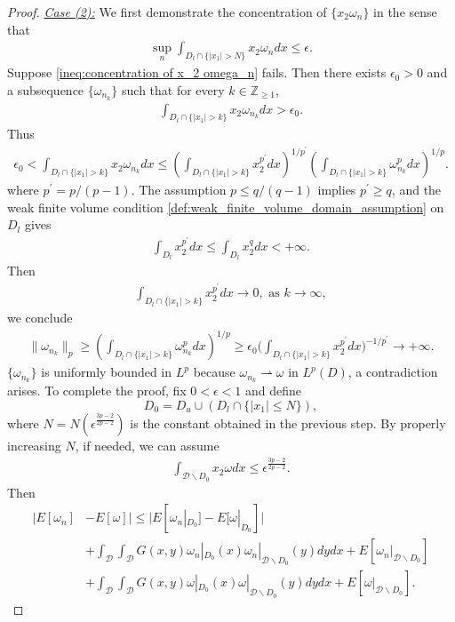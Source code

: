 \documentclass[11pt,letterpaper]{amsart}
\theoremstyle{definition}
\theoremstyle{remark}
\newcommand{\D}{\mathcal{D}}
\renewcommand{\tt}[1]{\text{#1}}
\numberwithin{equation}{section}
\begin{document}
\begin{proof}
    \underline{\textit{Case (2):}} We first demonstrate the concentration of $\{x_2\omega_n\}$ in the sense that
    \begin{align}
        \sup_{n}\int_{D_l \cap \{|x_1|>N\}} x_2 \omega_n dx\leq \epsilon. \label{ineq:concentration of x_2 omega_n}
    \end{align}
    Suppose \eqref{ineq:concentration of x_2 omega_n} fails. Then there exists $\epsilon_0>0$ and a subsequence $\{\omega_{n_k}\}$ such that for every $k \in \mathbb{Z}_{\geq 1}$,
    \begin{align*}
        \int_{D_l \cap \{|x_1|>k\}} x_2 \omega_{n_k} dx > \epsilon_0.
    \end{align*}
    Thus 
    \begin{align*}
        \epsilon_0 < \int_{D_l \cap \{|x_1|>k\}} x_2 \omega_{n_k} dx \leq  \left(\int_{D_l \cap \{|x_1|>k\}} x_2^{p^\prime} dx\right)^{1/p^\prime}\left(\int_{D_l \cap \{|x_1|>k\}} \omega_{n_k}^p dx\right)^{1/p}.
    \end{align*}
    where $p^\prime=p/(p-1) $. The assumption $p \leq q/(q-1)$ implies $p^\prime\geq q$, and the weak finite volume condition \eqref{def:weak_finite_volume_domain_assumption} on $D_l$ gives
    \begin{align*}
        \int_{D_l}x_2^{p^\prime}dx\leq \int_{D_l}x_2^{q}dx <+\infty.
    \end{align*}
    Then 
    \begin{align*}
        \int_{D_l \cap \{|x_1|>k\}} x_2^{p^\prime} dx \rightarrow 0, \tt{ as } k \rightarrow \infty,
    \end{align*}
    we conclude
    \begin{align*}
        \|\omega_{n_k}\|_{p} \geq (\int_{D_l \cap \{|x_1|>k\}} \omega_{n_k}^p dx)^{1/p} \geq \epsilon_0 \Big(\int_{D_l \cap \{|x_1|>k\}} x_2^{p^\prime} dx\Big)^{-1/p^\prime}\rightarrow +\infty.
    \end{align*}
    $\{\omega_{n_k}\}$ is uniformly bounded in $L^p$ because $\omega_{n_k}\rightharpoonup\omega$ in $L^p(D)$, a contradiction arises. 
    To complete the proof, fix $0<\epsilon<1$ and define
    $$
        D_0=D_u\cup(D_l \cap \{|x_1|\leq N\}),
    $$
    where $N=N(\epsilon^{\frac{3p-2}{2p-2}})$ is the constant obtained in the previous step. By properly increasing $N$, if needed, we can assume
    \begin{align*}
        \int_{\D\backslash D_0} x_2\omega dx\leq \epsilon^{\frac{3p-2}{2p-2}}.
    \end{align*}
    Then 
    \begin{align*}
        |E[\omega_n] & - E[\omega]| \leq |E[\omega_n|_{D_0}]-E[\omega|_{D_0}]| \\
        & + \int_{\mathcal{D}}\int_{\mathcal{D}} G(x,y)\omega_n|_{D_0}(x)\omega_n|_{\mathcal{D}\backslash D_0}(y)dydx + E[\omega_n|_{\mathcal{D}\backslash D_0}]\\
        & + \int_{\mathcal{D}}\int_{\mathcal{D}} G(x,y)\omega|_{D_0}(x)\omega|_{\mathcal{D}\backslash D_0}(y)dydx + E[\omega|_{\mathcal{D}\backslash D_0}].
    \end{align*}


\end{proof}
\end{document}

